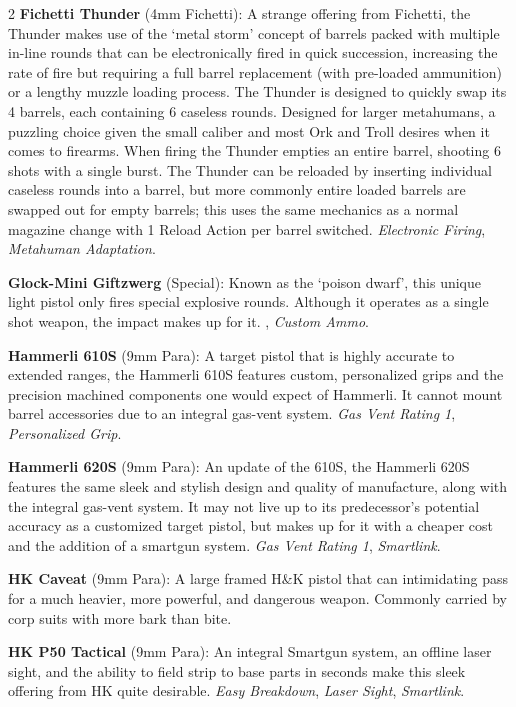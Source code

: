 \documentclass[
  oneside]{article}
\begin{document}
\begin{multicols}{2}
\textbf{Fichetti Thunder} (4mm Fichetti): A
strange offering from Fichetti, the Thunder makes
use of the `metal storm' concept of barrels packed
with multiple in-line rounds that can be
electronically fired in quick succession,
increasing the rate of fire but requiring a full
barrel replacement (with pre-loaded ammunition) or
a lengthy muzzle loading process. The Thunder is
designed to quickly swap its 4 barrels, each
containing 6 caseless rounds. Designed for larger
metahumans, a puzzling choice given the small
caliber and most Ork and Troll desires when it
comes to firearms. When firing the Thunder empties
an entire barrel, shooting 6 shots with a single
burst. The Thunder can be reloaded by inserting
individual caseless rounds into a barrel, but more
commonly entire loaded barrels are swapped out for
empty barrels; this uses the same mechanics as a
normal magazine change with 1 Reload Action per
barrel switched. \emph{Electronic Firing},
\emph{Metahuman Adaptation}.

\textbf{Glock-Mini Giftzwerg} (Special): Known as
the `poison dwarf', this unique light pistol only
fires special explosive rounds. Although it
operates as a single shot weapon, the impact makes
up for it. , \emph{Custom Ammo}.

\textbf{Hammerli 610S} (9mm Para): A target pistol
that is highly accurate to extended ranges, the
Hammerli 610S features custom, personalized grips
and the precision machined components one would
expect of Hammerli. It cannot mount barrel
accessories due to an integral gas-vent system.
\emph{Gas Vent Rating 1}, \emph{Personalized
Grip}.

\textbf{Hammerli 620S} (9mm Para): An update of
the 610S, the Hammerli 620S features the same
sleek and stylish design and quality of
manufacture, along with the integral gas-vent
system. It may not live up to its predecessor's
potential accuracy as a customized target pistol,
but makes up for it with a cheaper cost and the
addition of a smartgun system. \emph{Gas Vent
Rating 1}, \emph{Smartlink}.

\textbf{HK Caveat} (9mm Para): A large framed H\&K
pistol that can intimidating pass for a much
heavier, more powerful, and dangerous weapon.
Commonly carried by corp suits with more bark than
bite.

\textbf{HK P50 Tactical} (9mm Para): An integral
Smartgun system, an offline laser sight, and the
ability to field strip to base parts in seconds
make this sleek offering from HK quite desirable.
\emph{Easy Breakdown}, \emph{Laser Sight},
\emph{Smartlink}.


\end{multicols}
\end{document}
